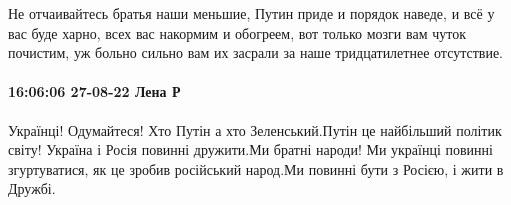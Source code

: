 Не отчаивайтесь братья наши меньшие, Путин приде и порядок наведе, и всё у вас
буде харно, всех вас накормим и обогреем, вот только мозги вам чуток почистим,
уж больно сильно вам их засрали за наше тридцатилетнее отсутствие.

\paragraph{16:06:06 27-08-22 Лена Р}

Українці! Одумайтеся! Хто Путін а хто Зеленський.Путін це найбільший політик
світу! Україна і Росія повинні дружити.Ми братні народи! Ми українці повинні
згуртуватися, як це зробив російський народ.Ми повинні бути з Росією, і жити в
Дружбі.







